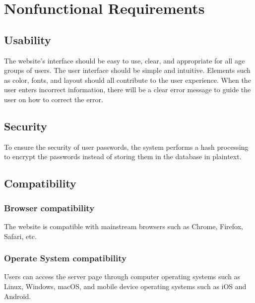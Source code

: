 \documentclass[conference]{IEEEtran}
\begin{document}
\section{Nonfunctional Requirements}

\subsection{ Usability }

The website's interface should be easy to use, clear, and appropriate for all 
age groups of users. The user interface should be simple and intuitive. Elements 
such as color, fonts, and layout should all contribute to the user experience.
When the user enters incorrect information, there will be a clear error message 
to guide the user on how to correct the error.

\subsection{ Security }

To ensure the security of user passwords, the system performs a hash 
processing to encrypt the passwords instead of storing them in the database in 
plaintext.


\subsection{ Compatibility }


\subsubsection{ Browser compatibility }


The website is compatible with mainstream browsers such as Chrome, 
Firefox, Safari, etc.

\subsubsection{ Operate System compatibility }

Users can access the server page through computer operating systems 
such as Linux, Windows, macOS, and mobile device operating systems such 
as iOS and Android.
\end{document}
